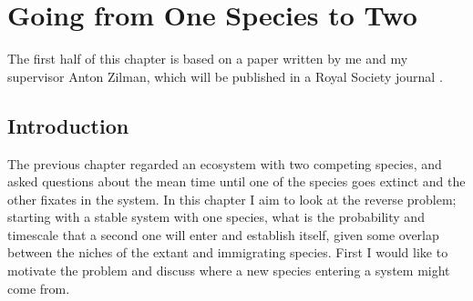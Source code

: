 \chapter{Going from One Species to Two}



The first half of this chapter is based on a paper written by me and my supervisor Anton Zilman, which will be published in a Royal Society journal \cite{Badali2018}. 



\section{Introduction}
The previous chapter regarded an ecosystem with two competing species, and asked questions about the mean time until one of the species goes extinct and the other fixates in the system. 
In this chapter I aim to look at the reverse problem; starting with a stable system with one species, what is the probability and timescale that a second one will enter and establish itself, given some overlap between the niches of the extant and immigrating species. 
First I would like to motivate the problem and discuss where a new species entering a system might come from. 

